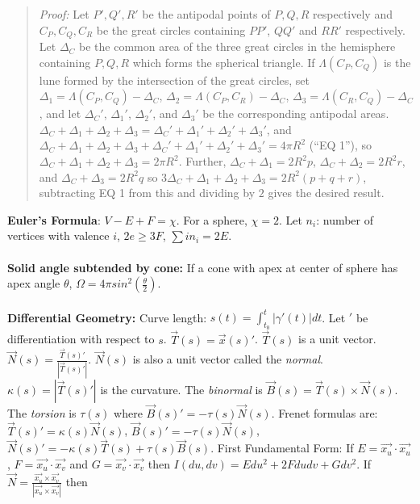 \begin{quote}
\emph{Proof:} Let $P', Q', R'$ be the antipodal points of $P, Q, R$ respectively and
$C_P, C_Q, C_R$ be the great circles containing $PP'$, $QQ'$ and $RR'$ respectively.
Let $\Delta_C$ be the common area of the three great circles in the hemisphere containing
$P, Q, R$ which forms the spherical triangle.  If $\Lambda(C_P, C_Q)$ 
is the lune formed by the intersection of the great circles, set 
$\Delta_1= \Lambda(C_P, C_Q) - \Delta_C$,
$\Delta_2= \Lambda(C_P, C_R) - \Delta_C$,
$\Delta_3= \Lambda(C_R, C_Q) - \Delta_C$, and let
$\Delta_C'$, $\Delta_1'$, $\Delta_2'$, and
$\Delta_3'$ be the corresponding antipodal areas.  
$\Delta_C+ \Delta_1+ \Delta_2+ \Delta_3= \Delta_C'+ \Delta_1'+ \Delta_2'+ \Delta_3'$,
and
$\Delta_C+ \Delta_1+ \Delta_2+ \Delta_3+\Delta_C'+ \Delta_1'+ \Delta_2'+ \Delta_3'
=4 \pi R^2$ (``EQ 1''), so
$\Delta_C+ \Delta_1+ \Delta_2+ \Delta_3= 2 \pi R^2$.  Further,
$\Delta_C + \Delta_1= 2 R^2 p$, $\Delta_C + \Delta_2= 2 R^2 r$, and
$\Delta_C + \Delta_3= 2 R^2 q$ so
$3\Delta_C+ \Delta_1+ \Delta_2+ \Delta_3 = 2 R^2 (p+q+r)$, 
subtracting EQ 1 from this and dividing by $2$ gives the desired result.
\end{quote}
{\bf Euler's Formula}: $V-E+F= \chi$. For a sphere, $\chi=2$.
Let $n_i$: number of vertices with valence $i$, $2e \geq 3F$, $\sum in_i = 2E$.
\\
\\
{\bf Solid angle subtended by cone:} If a cone with apex at center of sphere has apex angle $\theta$,
$\Omega = 4 \pi sin^2({\frac {\theta} 2})$.
\\
\\
{\bf Differential Geometry:}
Curve length: $s(t)= \int_{t_0}^t | \gamma'(t)| dt$.  Let $'$ be differentiation with respect to
$s$.
${\vec T} (s)=  {\vec x(s)}'$.  ${\vec T} (s)$ is a unit vector. ${\vec N (s)} = {\frac {{\vec T} (s)'}
{|{\vec T} (s)'|}}$.  ${\vec N (s)}$ is also a unit vector called the \emph{normal}.  $\kappa(s)= |{\vec T} (s)'|$
is the curvature.  The \emph{binormal} is ${\vec B(s)} = {\vec T} (s) \times {\vec N (s)}$.  The \emph{torsion} is
$\tau(s)$ where  ${\vec B(s)}' = -\tau(s)  {\vec N (s)}$.  Frenet formulas are:
${\vec T (s)}' = \kappa(s) {\vec N(s)}$, 
${\vec B (s)}' = -\tau(s){\vec N(s)}$, 
${\vec N (s)}' = -\kappa(s) {\vec T(s)} + \tau(s) {\vec B(s)}$.
First Fundamental Form: 
If $E= {\vec {x_u}} \cdot {\vec {x_u}}$,
$F= {\vec {x_u}} \cdot {\vec {x_v}}$ and
$G= {\vec {x_v}} \cdot {\vec {x_v}}$ then $I(du, dv)= E du^2 + 2F du dv + G dv^2$.
If ${\vec N}= {\frac { {\vec {x_u}} \times {\vec {x_v}} }
{| {\vec {x_u}} \times {\vec {x_v}} |} }$ then
